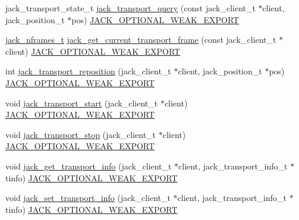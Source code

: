 \begin{DoxyCompactItemize}
\item 
jack\-\_\-transport\-\_\-state\-\_\-t \hyperlink{group__TransportControl_ga5f08eb71a5ee5431a3d756af5729d5aa}{jack\-\_\-transport\-\_\-query} (const jack\-\_\-client\-\_\-t $\ast$client, jack\-\_\-position\-\_\-t $\ast$pos) \hyperlink{weakmacros_8h_adf1bde0dd996bbf61a44311165014dd1}{\-J\-A\-C\-K\-\_\-\-O\-P\-T\-I\-O\-N\-A\-L\-\_\-\-W\-E\-A\-K\-\_\-\-E\-X\-P\-O\-R\-T}
\item 
\hyperlink{types_8h_aa954df532e901ae5172e68a23f3da9b6}{jack\-\_\-nframes\-\_\-t} \hyperlink{group__TransportControl_gaef1df9479faa3b7f400c787be173f805}{jack\-\_\-get\-\_\-current\-\_\-transport\-\_\-frame} (const jack\-\_\-client\-\_\-t $\ast$client) \hyperlink{weakmacros_8h_adf1bde0dd996bbf61a44311165014dd1}{\-J\-A\-C\-K\-\_\-\-O\-P\-T\-I\-O\-N\-A\-L\-\_\-\-W\-E\-A\-K\-\_\-\-E\-X\-P\-O\-R\-T}
\item 
int \hyperlink{group__TransportControl_ga6e51cb0600c5ba298546dc5420e0ccbc}{jack\-\_\-transport\-\_\-reposition} (jack\-\_\-client\-\_\-t $\ast$client, jack\-\_\-position\-\_\-t $\ast$pos) \hyperlink{weakmacros_8h_adf1bde0dd996bbf61a44311165014dd1}{\-J\-A\-C\-K\-\_\-\-O\-P\-T\-I\-O\-N\-A\-L\-\_\-\-W\-E\-A\-K\-\_\-\-E\-X\-P\-O\-R\-T}
\item 
void \hyperlink{group__TransportControl_gab7b158bec8f27c03da29795f142d1caf}{jack\-\_\-transport\-\_\-start} (jack\-\_\-client\-\_\-t $\ast$client) \hyperlink{weakmacros_8h_adf1bde0dd996bbf61a44311165014dd1}{\-J\-A\-C\-K\-\_\-\-O\-P\-T\-I\-O\-N\-A\-L\-\_\-\-W\-E\-A\-K\-\_\-\-E\-X\-P\-O\-R\-T}
\item 
void \hyperlink{group__TransportControl_ga6be6637c314bd88344826e9bcc1957b0}{jack\-\_\-transport\-\_\-stop} (jack\-\_\-client\-\_\-t $\ast$client) \hyperlink{weakmacros_8h_adf1bde0dd996bbf61a44311165014dd1}{\-J\-A\-C\-K\-\_\-\-O\-P\-T\-I\-O\-N\-A\-L\-\_\-\-W\-E\-A\-K\-\_\-\-E\-X\-P\-O\-R\-T}
\item 
void \hyperlink{group__TransportControl_gaa3f548f66e8c9a4f271ef97a87ecb240}{jack\-\_\-get\-\_\-transport\-\_\-info} (jack\-\_\-client\-\_\-t $\ast$client, jack\-\_\-transport\-\_\-info\-\_\-t $\ast$tinfo) \hyperlink{weakmacros_8h_adf1bde0dd996bbf61a44311165014dd1}{\-J\-A\-C\-K\-\_\-\-O\-P\-T\-I\-O\-N\-A\-L\-\_\-\-W\-E\-A\-K\-\_\-\-E\-X\-P\-O\-R\-T}
\item 
void \hyperlink{group__TransportControl_ga2539e041b424eab678e7ba1ee4777579}{jack\-\_\-set\-\_\-transport\-\_\-info} (jack\-\_\-client\-\_\-t $\ast$client, jack\-\_\-transport\-\_\-info\-\_\-t $\ast$tinfo) \hyperlink{weakmacros_8h_adf1bde0dd996bbf61a44311165014dd1}{\-J\-A\-C\-K\-\_\-\-O\-P\-T\-I\-O\-N\-A\-L\-\_\-\-W\-E\-A\-K\-\_\-\-E\-X\-P\-O\-R\-T}
\end{DoxyCompactItemize}


